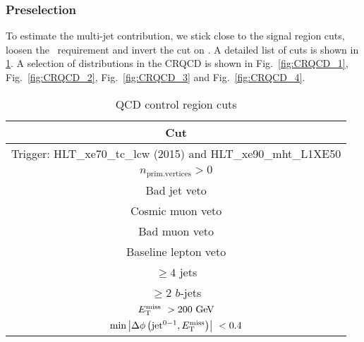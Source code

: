 

 \subsubsection{Preselection}
 \label{sec:QCDCR}

To estimate the multi-jet contribution, we stick close to the signal region cuts, loosen the \met\ requirement and invert the cut on \mindphijettwomet. A detailed list of cuts is shown in \ref{tb:qcdcr_cuts}.
 A selection of distributions in the CRQCD is shown in Fig.~\ref{fig:CRQCD_1}, Fig.~\ref{fig:CRQCD_2}, Fig.~\ref{fig:CRQCD_3} and Fig.~\ref{fig:CRQCD_4}.\\

 \begin{table}[htp]
 \caption{QCD control region cuts}
 \begin{center}
 \begin{tabular}{c} \hline
   Cut\\ \hline
   Trigger: HLT\_xe70\_tc\_lcw (2015) and HLT\_xe90\_mht\_L1XE50\\
   $n_\mathrm{prim. vertices} > 0$\\
   Bad jet veto\\
   Cosmic muon veto\\
   Bad muon veto\\
   Baseline lepton veto\\
   $\geq 4$ jets\\
   $\geq 2$ $b$-jets\\
   $\met\ > 200\GeV$\\
   $\min \left|\Delta\phi\left(\mathrm{jet}^{0-1},E_{\mathrm{T}}^{\mathrm{miss}}\right)\right|\ < 0.4$\\
   \hline
 \end{tabular}
 \end{center}
 \label{tb:qcdcr_cuts}
 \end{table}


